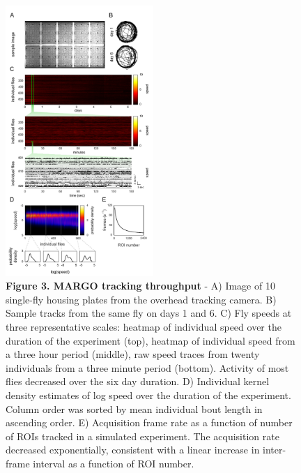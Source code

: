 \documentclass[10pt]{article}
\begin{document}
\newpage
\begin{figure}[h!]
	\begin{center}
		\includegraphics[width=0.5\textwidth]{../figures/960_fly_imaging_panel_sm.pdf}
	\end{center}
	\caption*{\footnotesize \textbf{Figure 3. MARGO tracking throughput} - A) Image of 10 single-fly housing plates from the overhead tracking camera. B) Sample tracks from the same fly on days 1 and 6. C) Fly speeds at three representative scales: heatmap of individual speed over the duration of the experiment (top), heatmap of individual speed from a three hour period (middle), raw speed traces from twenty individuals from a three minute period (bottom). Activity of most flies decreased over the six day duration. D) Individual kernel density estimates of log speed over the duration of the experiment. Column order was sorted by mean individual bout length in ascending order. E) Acquisition frame rate as a function of number of ROIs tracked in a simulated experiment. The acquisition rate decreased exponentially, consistent with a linear increase in inter-frame interval as a function of ROI number.}
\end{figure}
\end{document}
